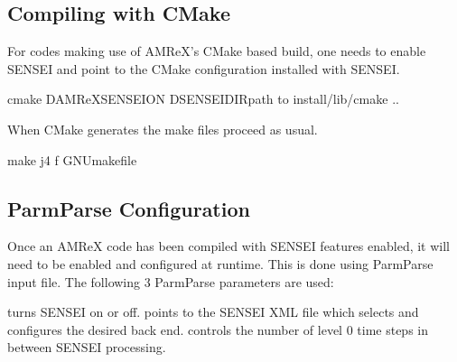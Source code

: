 \documentclass[letterpaper,10pt,english]{sphinxmanual}
\begin{document}
\subsection{Compiling with CMake}
\label{\detokenize{Visualization:compiling-with-cmake}}
\sphinxAtStartPar
For codes making use of AMReX’s CMake based build, one needs to enable SENSEI
and point to the CMake configuration installed with SENSEI.

\begin{sphinxVerbatim}[commandchars=\\\{\}]
cmake \PYGZhy{}DAMReX\PYGZus{}SENSEION \PYGZhy{}DSENSEI\PYGZus{}DIR\PYGZlt{}path to install\PYGZgt{}/lib/cmake ..
\end{sphinxVerbatim}

\sphinxAtStartPar
When CMake generates the make files proceed as usual.

\begin{sphinxVerbatim}[commandchars=\\\{\}]
make \PYGZhy{}j4 \PYGZhy{}f GNUmakefile
\end{sphinxVerbatim}


\subsection{ParmParse Configuration}
\label{\detokenize{Visualization:parmparse-configuration}}
\sphinxAtStartPar
Once an AMReX code has been compiled with SENSEI features enabled, it will need
to be enabled and configured at runtime. This is done using ParmParse input file.
The following 3 ParmParse parameters are used:

\begin{sphinxVerbatim}[commandchars=\\\{\}]
  
  
  
\end{sphinxVerbatim}

\sphinxAtStartPar
{} turns SENSEI on or off.   points to
the SENSEI XML file which selects and configures the desired back end.
 controls the number of level 0 time steps in between
SENSEI processing.
\end{document}
